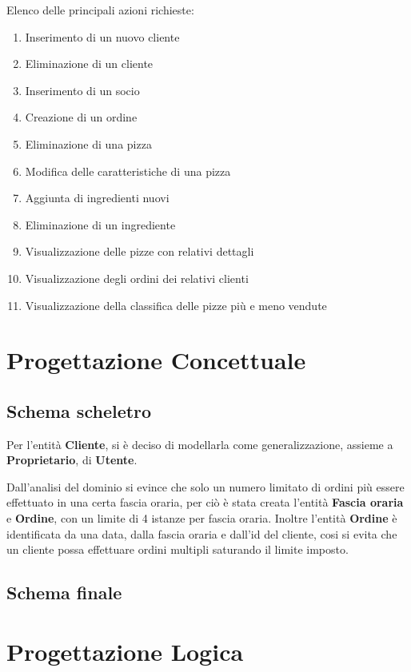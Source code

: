 \documentclass[a4paper,12pt, oneside]{article}
\begin{document}
Elenco delle principali azioni richieste:
\begin{enumerate}
    \item Inserimento di un nuovo cliente
    \item Eliminazione di un cliente
    \item Inserimento di un socio
    \item Creazione di un ordine
    \item Eliminazione di una pizza
    \item Modifica delle caratteristiche di una pizza
    \item Aggiunta di ingredienti nuovi
    \item Eliminazione di un ingrediente
    \item Visualizzazione delle pizze con relativi dettagli
    \item Visualizzazione degli ordini dei relativi clienti
    \item Visualizzazione della classifica delle pizze più e meno vendute
\end{enumerate}

\section{Progettazione Concettuale}
\subsection{Schema scheletro}

Per l'entità \textbf{Cliente}, si è deciso di modellarla come
generalizzazione, assieme a \textbf{Proprietario}, di \textbf{Utente}.

Dall'analisi del dominio si evince che solo un numero limitato di ordini
più essere effettuato in una certa fascia oraria, per ciò è stata creata
l'entità \textbf{Fascia oraria} e \textbf{Ordine}, con un limite di 4
istanze per fascia oraria. Inoltre l'entità \textbf{Ordine} è identificata
da una data, dalla fascia oraria e dall'id del cliente, cosi si evita che
un cliente possa effettuare ordini multipli saturando il limite imposto.

\subsection{Schema finale}

\section{Progettazione Logica}
\end{document}
